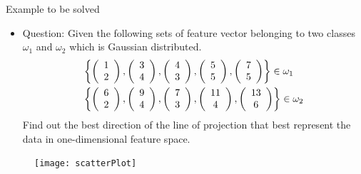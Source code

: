 \begin{frame}{Example to be solved}
\begin{footnotesize}
\begin{itemize}
\item[] {\color{mycolor2}Question}: Given the following sets of feature vector belonging to two classes $\omega_1$ and $\omega_2$ which is Gaussian distributed.
$$\begin{gathered}
  \left\{ {\left( {\begin{array}{*{20}{c}}
  1 \\ 
  2 
\end{array}} \right),\left( {\begin{array}{*{20}{c}}
  3 \\ 
  4 
\end{array}} \right),\left( {\begin{array}{*{20}{c}}
  4 \\ 
  3 
\end{array}} \right),\left( {\begin{array}{*{20}{c}}
  5 \\ 
  5 
\end{array}} \right),\left( {\begin{array}{*{20}{c}}
  7 \\ 
  5 
\end{array}} \right)} \right\} \in {\omega _1} \hfill \\
  \left\{ {\left( {\begin{array}{*{20}{c}}
  6 \\ 
  2 
\end{array}} \right),\left( {\begin{array}{*{20}{c}}
  9 \\ 
  4 
\end{array}} \right),\left( {\begin{array}{*{20}{c}}
  {7} \\ 
  3 
\end{array}} \right),\left( {\begin{array}{*{20}{c}}
  {11} \\ 
  4 
\end{array}} \right),\left( {\begin{array}{*{20}{c}}
  {13} \\ 
  6 
\end{array}} \right)} \right\} \in {\omega _2} \hfill \\ 
\end{gathered} $$
Find out the best direction of the line of projection that best represent the data in one-dimensional feature space.\\
\end{itemize}
\end{footnotesize}
\vspace{-16pt}
\begin{figure}
\texttt{[image: scatterPlot]}
\end{figure}
\end{frame}


